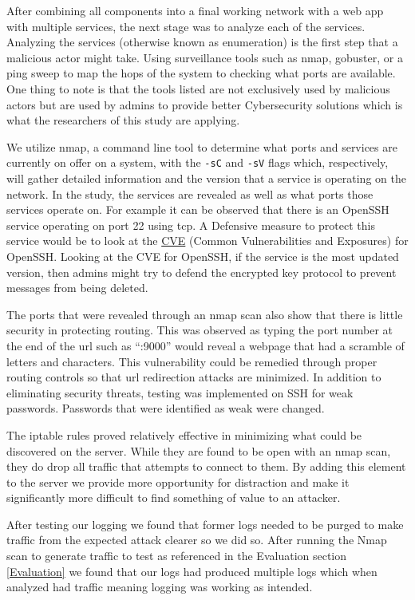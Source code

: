 After combining all components into a final working network with a web app with multiple services, the next stage was to analyze each of the services. 
Analyzing the services (otherwise known as enumeration) is the first step that a malicious actor might take. Using surveillance tools 
such as nmap, gobuster, or a ping sweep to map the hops of the system to checking what ports are available. One thing to note is that the tools listed 
are not exclusively used by malicious actors but are used by admins to provide better Cybersecurity solutions which is what the researchers of this 
study are applying.

We utilize nmap, a command line tool to determine what ports and services are currently on offer on a system,   
with the \verb|-sC| and \verb|-sV| flags which, respectively, will gather detailed information and the version that a service is operating on the network. In the 
study, the services are revealed as well as what ports those services operate on. For example it can be observed that there is an OpenSSH service 
operating on port 22 using tcp. A Defensive measure to protect this service would be to look at the \hyperlink{https://cve.mitre.org/}{CVE} (Common 
Vulnerabilities and Exposures) for OpenSSH. Looking at the CVE for OpenSSH, if the service is the most updated version, then admins might try to defend the encrypted 
key protocol to prevent messages from being deleted.

The ports that were revealed through an nmap scan also show that there is little security in protecting routing. This was observed as typing the port 
number at the end of the url such as “:9000” would reveal a webpage that had a scramble of letters and characters. This vulnerability could be remedied 
through proper routing controls so that url redirection attacks are minimized. In addition to eliminating security threats, testing was implemented on 
SSH for weak passwords. Passwords that were identified as weak were changed.

The iptable rules proved relatively effective in minimizing what could be discovered on the server. While they are found to be open with an nmap scan, they do drop all traffic that attempts to connect to them. By adding this element to the server we provide more opportunity for distraction and make it significantly more difficult to find something of value to an attacker. 

After testing our logging we found that former logs needed to be purged to make traffic from the expected attack clearer so we did so. After running the Nmap scan to generate traffic to test as referenced in the Evaluation section \ref{Evaluation} we found that our logs had produced multiple logs which when analyzed had traffic meaning logging was working as intended.



